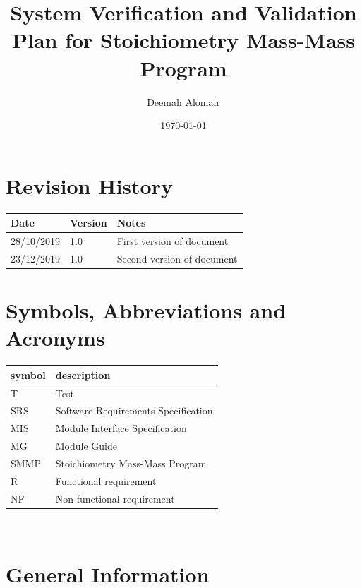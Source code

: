 \documentclass[12pt, titlepage]{article}
\begin{document}
\title{System Verification and Validation Plan for Stoichiometry Mass-Mass Program } 
\author{Deemah Alomair}
\date{\today}
	
\maketitle


\section{Revision History}

\begin{tabularx}{\textwidth}{p{3cm}p{2cm}X}
\toprule {\bf Date} & {\bf Version} & {\bf Notes}\\
\midrule
28/10/2019 & 1.0 & First version of document\\
23/12/2019 & 1.0 & Second version of document\\
\bottomrule
\end{tabularx}

\newpage

\tableofcontents

\newpage

\section{Symbols, Abbreviations and Acronyms}

\renewcommand{\arraystretch}{1.2}
\begin{tabular}{l l} 
  \toprule		
  \textbf{symbol} & \textbf{description}\\
  \midrule 
   T & Test\\
  SRS & Software Requirements Specification\\
  MIS & Module Interface Specification\\
  MG & Module Guide\\
  SMMP & Stoichiometry Mass-Mass Program \\
  R & Functional requirement\\
  NF & Non-functional requirement\\
  \bottomrule
\end{tabular}\\

\newpage


\section{General Information}
\end{document}
